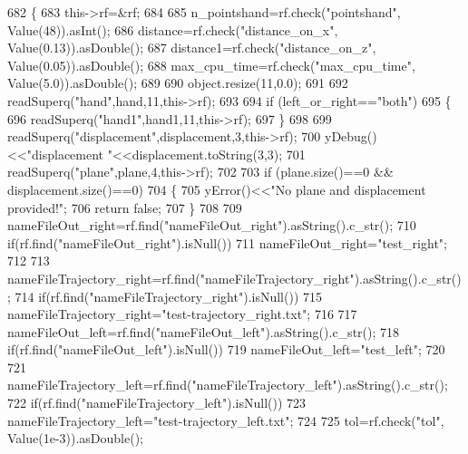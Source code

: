 \begin{DoxyCode}
682 \{
683     this->rf=&rf;
684 
685     n\_pointshand=rf.check(\textcolor{stringliteral}{"pointshand"}, Value(48)).asInt();
686     distance=rf.check(\textcolor{stringliteral}{"distance\_on\_x"}, Value(0.13)).asDouble();
687     distance1=rf.check(\textcolor{stringliteral}{"distance\_on\_z"}, Value(0.05)).asDouble();
688     max\_cpu\_time=rf.check(\textcolor{stringliteral}{"max\_cpu\_time"}, Value(5.0)).asDouble();
689 
690     \textcolor{keywordtype}{object}.resize(11,0.0);
691 
692     readSuperq(\textcolor{stringliteral}{"hand"},hand,11,this->rf);
693 
694     \textcolor{keywordflow}{if} (left\_or\_right==\textcolor{stringliteral}{"both"})
695     \{
696         readSuperq(\textcolor{stringliteral}{"hand1"},hand1,11,this->rf);
697     \}
698 
699     readSuperq(\textcolor{stringliteral}{"displacement"},displacement,3,this->rf);
700     yDebug()<<\textcolor{stringliteral}{"displacement "}<<displacement.toString(3,3);
701     readSuperq(\textcolor{stringliteral}{"plane"},plane,4,this->rf);
702 
703     \textcolor{keywordflow}{if} (plane.size()==0 && displacement.size()==0)
704     \{
705         yError()<<\textcolor{stringliteral}{"No plane and displacement provided!"};
706         \textcolor{keywordflow}{return} \textcolor{keyword}{false};
707     \}
708 
709     nameFileOut\_right=rf.find(\textcolor{stringliteral}{"nameFileOut\_right"}).asString().c\_str();
710     \textcolor{keywordflow}{if}(rf.find(\textcolor{stringliteral}{"nameFileOut\_right"}).isNull())
711        nameFileOut\_right=\textcolor{stringliteral}{"test\_right"};
712 
713     nameFileTrajectory\_right=rf.find(\textcolor{stringliteral}{"nameFileTrajectory\_right"}).asString().c\_str();
714     \textcolor{keywordflow}{if}(rf.find(\textcolor{stringliteral}{"nameFileTrajectory\_right"}).isNull())
715        nameFileTrajectory\_right=\textcolor{stringliteral}{"test-trajectory\_right.txt"};
716 
717     nameFileOut\_left=rf.find(\textcolor{stringliteral}{"nameFileOut\_left"}).asString().c\_str();
718     \textcolor{keywordflow}{if}(rf.find(\textcolor{stringliteral}{"nameFileOut\_left"}).isNull())
719        nameFileOut\_left=\textcolor{stringliteral}{"test\_left"};
720 
721     nameFileTrajectory\_left=rf.find(\textcolor{stringliteral}{"nameFileTrajectory\_left"}).asString().c\_str();
722     \textcolor{keywordflow}{if}(rf.find(\textcolor{stringliteral}{"nameFileTrajectory\_left"}).isNull())
723        nameFileTrajectory\_left=\textcolor{stringliteral}{"test-trajectory\_left.txt"};
724 
725     tol=rf.check(\textcolor{stringliteral}{"tol"}, Value(1e-3)).asDouble();

\end{DoxyCode}
